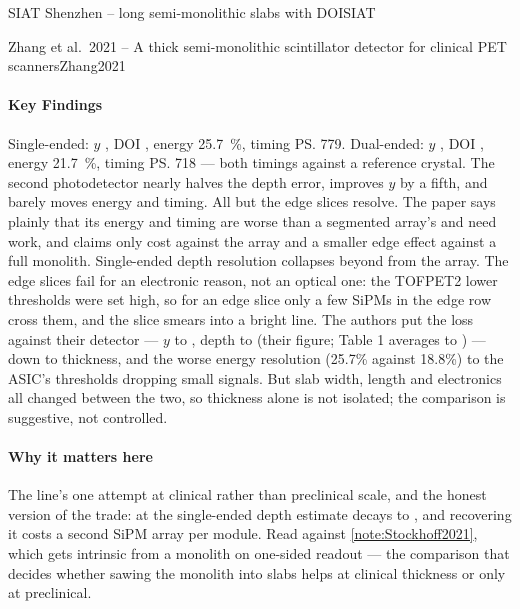 \begin{programnote}{SIAT Shenzhen -- long semi-monolithic slabs with DOI}{SIAT}
\begin{papernote}{Zhang et al.\ 2021 -- A thick semi-monolithic scintillator detector for clinical PET scanners}{Zhang2021}
\paragraph{Key Findings}
Single-ended: $y$ , DOI , energy \qty{25.7}{\percent}, timing
\ps{779}. Dual-ended: $y$ , DOI , energy
\qty{21.7}{\percent}, timing \ps{718} --- both timings against a
 reference crystal. The second photodetector nearly
halves the depth error, improves $y$ by a fifth, and barely moves energy and
timing. All but the edge slices resolve.
The paper says plainly that its energy and timing are worse than a segmented
array's and need work, and claims only cost against the array and a smaller
edge effect against a full monolith.
Single-ended depth resolution collapses beyond  from the array.
The edge slices fail for an electronic reason, not an optical one: the
TOFPET2 lower thresholds were set high, so for an edge slice only a few SiPMs
in the edge row cross them, and the slice smears into a bright line.
The authors put the loss against their  detector --- $y$  to
, depth  to  (their figure; Table 1 averages to
) --- down to thickness, and the worse
energy resolution (25.7\% against 18.8\%) to the ASIC's thresholds dropping
small signals. But slab width, length and electronics all changed between
the two, so thickness alone is not isolated; the comparison is suggestive,
not controlled.

\paragraph{Why it matters here}
The line's one attempt at clinical rather than preclinical scale, and the
honest version of the trade: at  the single-ended depth estimate decays
to , and recovering it costs a second SiPM array per module. Read
against \ref{note:Stockhoff2021}, which gets  intrinsic from a
 monolith on one-sided readout --- the comparison that decides whether
sawing the monolith into slabs helps at clinical thickness or only at
preclinical.

\end{papernote}


\end{programnote}
